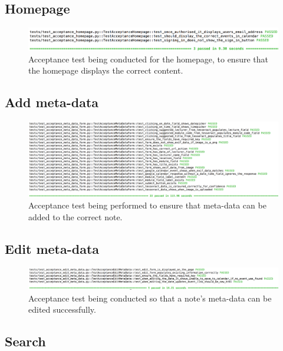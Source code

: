 \subsection{Homepage}

\begin{figure}[H]
  \centering
  \includegraphics[width=\textwidth]{images/test_acceptance_homepage}
  \caption{Acceptance test being conducted for the homepage, to ensure that the homepage displays the correct content.}
  \label{fig:acceptance_homepage}
\end{figure}

\subsection{Add meta-data}

\begin{figure}[H]
  \centering
  \includegraphics[width=\textwidth]{images/test_acceptance_meta_data_form}
  \caption{Acceptance test being performed to ensure that meta-data can be added to the correct note.}
  \label{fig:acceptance_add_meta_data}
\end{figure}

\subsection{Edit meta-data}
\begin{figure}[H]
  \centering
  \includegraphics[width=\textwidth]{images/test_acceptance_edit_meta_data}
  \caption{Acceptance test being conducted so that a note's meta-data can be edited successfully.}
  \label{fig:acceptance_edit_meta_data}
\end{figure}
\subsection{Search}

